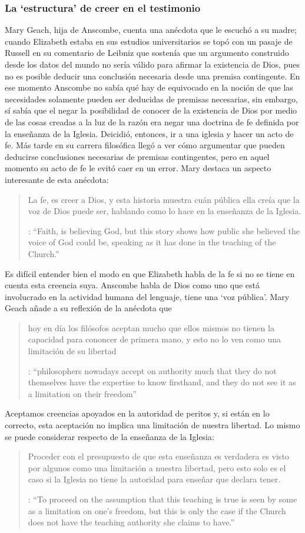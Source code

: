 \subsubsection{La `estructura' de creer en el testimonio}

Mary Geach, hija de Anscombe, cuenta una anécdota que le escuchó a su madre; cuando Elizabeth estaba en sus estudios universitarios se topó con un pasaje de Russell en su comentario de Leibniz que sostenía que un argumento construido desde los datos del mundo no sería válido para afirmar la existencia de Dios, pues no es posible deducir una conclusión necesaria desde una premisa contingente. En ese momento Anscombe no sabía qué hay de equivocado en la noción de que las necesidades solamente pueden ser deducidas de premisas necesarias, sin embargo, sí sabía que el negar la posibilidad de conocer de la existencia de Dios por medio de las cosas creadas a la luz de la razón era negar una doctrina de fe definida por la enseñanza de la Iglesia. Deicidió, entonces, ir a una iglesia y hacer un acto de fe. Más tarde en su carrera filosófica llegó a ver cómo argumentar que pueden deducirse conclusiones necesarias de premisas contingentes, pero en aquel momento su acto de fe le evitó caer en un error. Mary destaca un aspecto interesante de esta anécdota: \blockquote[{\cite[xvi--xvii]{anscombe2008faith}}: \enquote{Faith, \textelp{} is believing God, but this story shows how public she believed the voice of God could be, speaking as it has done in the teaching of the Church.}]{La fe, \textelp{} es creer a Dios, y esta historia muestra cuán pública ella creía que la voz de Dios puede ser, hablando como lo hace en la enseñanza de la Iglesia.} Es difícil entender bien el modo en que Elizabeth habla de la fe si no se tiene en cuenta esta creencia suya. Anscombe habla de Dios como uno que está involucrado en la actividad humana del lenguaje, tiene una `voz pública'. Mary Geach añade a su reflexión de la anécdota que \blockquote[{\cite[xvii]{anscombe2008faith}}: \enquote{philosophers nowadays accept on authority much that they do not themselves have the expertise to know firsthand, and they do not see it as a limitation on their freedom}]{hoy en día los filósofos aceptan mucho que ellos mismos no tienen la capacidad para cononcer de primera mano, y esto no lo ven como una limitación de su libertad}. Aceptamos creencias apoyados en la autoridad de peritos y, si están en lo correcto, esta aceptación no implica una limitación de nuestra libertad. Lo mismo se puede considerar respecto de la enseñanza de la Iglesia: \blockquote[{\cite[xvi--xvii]{anscombe2008faith}}: \enquote{To proceed on the assumption that this teaching is true is seen by some as a limitation on one's freedom, but this is only the case if the Church does not have the teaching authority she claims to have.}]{Proceder con el presupuesto de que esta enseñanza es verdadera es visto por algunos como una limitación a nuestra libertad, pero esto solo es el caso si la Iglesia no tiene la autoridad para enseñar que declara tener.}

